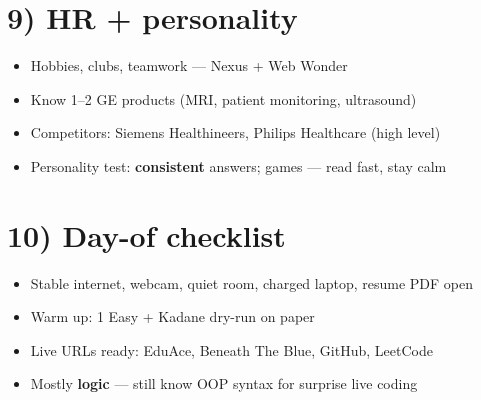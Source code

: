 \documentclass[a4paper,9pt]{extarticle}
\begin{document}
\section{9) HR + personality}
\begin{itemize}
  \item Hobbies, clubs, teamwork --- Nexus + Web Wonder
  \item Know 1--2 GE products (MRI, patient monitoring, ultrasound)
  \item Competitors: Siemens Healthineers, Philips Healthcare (high level)
  \item Personality test: \textbf{consistent} answers; games --- read fast, stay calm
\end{itemize}

\section{10) Day-of checklist}
\begin{itemize}
  \item Stable internet, webcam, quiet room, charged laptop, resume PDF open
  \item Warm up: 1 Easy + Kadane dry-run on paper
  \item Live URLs ready: EduAce, Beneath The Blue, GitHub, LeetCode
  \item Mostly \textbf{logic} --- still know OOP syntax for surprise live coding
\end{itemize}
\end{document}
